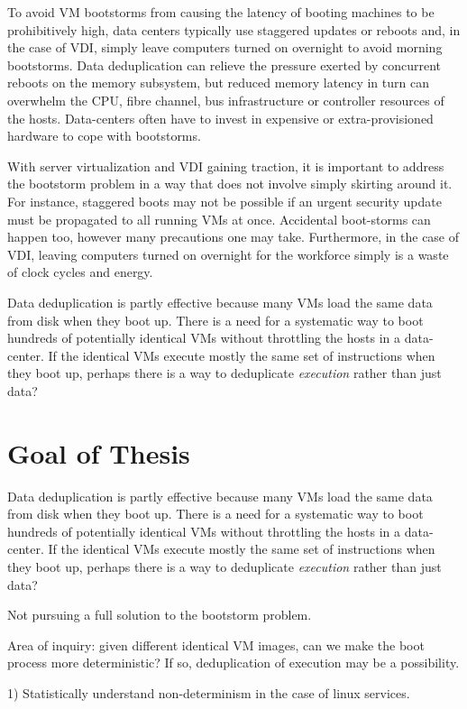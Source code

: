 To avoid VM bootstorms from causing the latency of booting machines
to be prohibitively high, data centers typically 
use staggered updates or reboots and, in the case of VDI,
simply leave computers turned on overnight to avoid morning
bootstorms. Data deduplication can relieve the pressure exerted by
concurrent reboots on the memory subsystem,
but reduced memory latency in turn can overwhelm the CPU,
fibre channel, bus infrastructure or controller resources of
the hosts. Data-centers often have to invest in expensive 
or extra-provisioned hardware to cope with bootstorms. 

With server virtualization and VDI gaining traction, it is
important to address the bootstorm problem in a way that does not 
involve simply skirting around it. For instance, staggered boots may not be 
possible if an urgent security update must be propagated to
all running VMs at once. Accidental boot-storms can happen too, 
however many precautions one may take. Furthermore,
in the case of VDI, leaving computers turned on overnight for the workforce
simply is a waste of clock cycles and energy. 

Data deduplication is partly effective because many VMs load
the same data from disk when they boot up.  There is a need 
for a systematic way to boot hundreds of potentially
identical VMs without throttling the hosts in a data-center.
If the identical VMs execute mostly the same set of instructions when they boot up,
perhaps there is a way to deduplicate \emph{execution} rather than just data?

\section{Goal of Thesis}

Data deduplication is partly effective because many VMs load
the same data from disk when they boot up.  There is a need 
for a systematic way to boot hundreds of potentially
identical VMs without throttling the hosts in a data-center.
If the identical VMs execute mostly the same set of instructions when they boot up,
perhaps there is a way to deduplicate \emph{execution} rather than just data?

Not pursuing a full solution to the bootstorm problem.

Area of inquiry: given different identical VM images, can we 
make the boot process more deterministic? If so, 
deduplication of execution may be a possibility.

1) Statistically understand non-determinism 
in the case of linux services.


